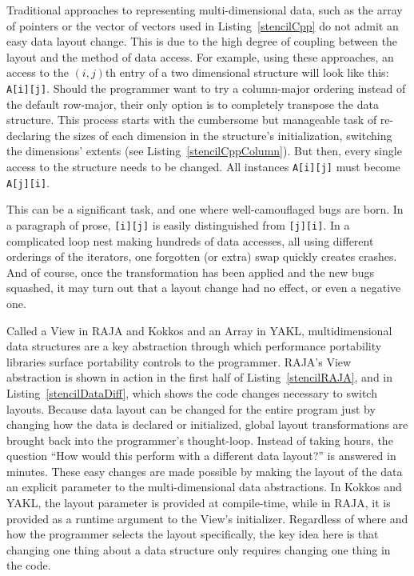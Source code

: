 Traditional approaches to representing multi-dimensional data, such as the array of pointers or the vector of vectors used in Listing~\ref{stencilCpp} do not admit an easy data layout change.
This is due to the high degree of coupling between the layout and the method of data access. 
For example, using these approaches, an access to the $(i,j)$th entry of a two dimensional structure will look like this: \verb.A[i][j]..
Should the programmer want to try a column-major ordering instead of the default row-major, their only option is to completely transpose the data structure.
This process starts with the cumbersome but manageable task of re-declaring the sizes of each dimension in the structure's initialization, switching the dimensions' extents (see Listing~\ref{stencilCppColumn}).
But then, every single access to the structure needs to be changed. 
All instances \verb.A[i][j]. must become \verb.A[j][i]..

This can be a significant task, and one where well-camouflaged bugs are born. 
In a paragraph of prose, \verb.[i][j]. is easily distinguished from \verb.[j][i]..
In a complicated loop nest making hundreds of data accesses, all using different orderings of the iterators, one forgotten (or extra) swap quickly creates crashes.
And of course, once the transformation has been applied and the new bugs squashed, it may turn out that a layout change had no effect, or even a negative one.

Called a View in RAJA and Kokkos and an Array in YAKL, multidimensional data structures are a key abstraction through which performance portability libraries surface portability controls to the programmer.
RAJA's View abstraction is shown in action in the first half of Listing~\ref{stencilRAJA}, and in Listing~\ref{stencilDataDiff}, which shows the code changes necessary to switch layouts.
Because data layout can be changed for the entire program just by changing how the data is declared or initialized, global layout transformations are brought back into the programmer's thought-loop.
Instead of taking hours, the question ``How would this perform with a different data layout?'' is answered in minutes.
These easy changes are made possible by making the layout of the data an explicit parameter to the multi-dimensional data abstractions.
In Kokkos and YAKL, the layout parameter is provided at compile-time, while in RAJA, it is provided as a runtime argument to the View's initializer.
Regardless of where and how the programmer selects the layout specifically, the key idea here is that changing one thing about a data structure only requires changing one thing in the code.

